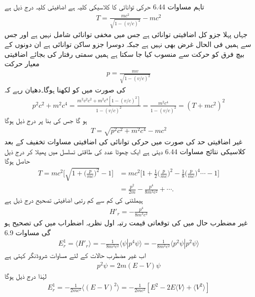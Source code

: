 تاہم مساوات 6.44 حرکی توانائی کا کلاسیکی کلیہ ہے اضافیتی کلیہ درج ذیل ہے 
\begin{align}
T = \frac{mc^2}{\sqrt{1 - (v/c)^2}} - mc^2
\end{align}
جہاں پہلا جزو کل اضافیتی  توانائی ہے جس میں مخفی توانائی شامل نہیں ہے اور جس سے ہمیں فی الحال غرض بھی نہیں ہے جبکہ دوسرا جزو ساکن توانائی ہے ان دونوں کے بیچ فرق کو حرکت سے منسوب کیا جا سکتا ہے ہمیں سمتی رفتار کی بجائے  اضافیتی معیار حرکت
\begin{align}
p = \frac{mv}{\sqrt{1 - (v/c)^2}}
\end{align}
 کی صورت میں  کو لکھنا ہوگا۔دھیان رہے کہ
\begin{align*}
p^2 c^2 + m^2 c^4 = \frac{m^2 v^2 c^2 + m^2 c^4 [1 - (v/c)^2]}{1 - (v/c)^2} = \frac{m^2 c^4}{1 - (v/c)^2} = (T + mc^2)^2
\end{align*}
ہو گا جس کی بنا پر درج ذیل ہوگا 
\begin{align}
T = \sqrt{p^2 c^2 + m^2 c^4} - mc^2
\end{align}
غیر اضافیتی حد  کی صورت میں حرکی توانائی کی اضافیتی مساوات تخفیف کے بعد کلاسیکی نتائج مساوات 6.44 دیتی ہے ایک چھوٹا عدد  کی طاقتی تسلسل میں پھیلا کر درج ذیل حاصل ہوگا 
\begin{align}
T = mc^2 \big [ \sqrt{1 + \big(\frac{p}{mc}\big)^2}  - 1 \big ] &= mc^2 \big [ 1 + \frac{1}{2} \big(\frac{p}{mc}\big)^2 - \frac{1}{8} \big(\frac{p}{mc}\big)^4 \cdots - 1 \big ] \nonumber \\
&= \frac{p^2}{2m} - \frac{p^4}{8m^3 c^2} + \cdots .
\end{align}
ہیملٹنی کی کم سے کم رتبی اضافیتی تصحیح درج ذیل ہے 
\begin{align}
H'_r = - \frac{p^4}{8m^3 c^2}
\end{align}
غیر مضطرب حال میں  کی توقعاتی قیمت رتبہ اول نظریہ اضطراب میں  کی تصحیح  ہو گی مساوات 6.9 
\begin{align}
E_r^1 = \langle H'_r \rangle = - \frac{1}{8 m^3 c^2} \langle \psi | p^4 \psi \rangle = - \frac{1}{8m^3 c^2} \langle p^2 \psi | p^2 \psi \rangle
\end{align}
اب غیر مضطرب حالات کے لئے مساوات شروڈنگر کہتی ہے 
\begin{align}
p^2 \psi = 2m (E - V) \psi
\end{align}
 لہٰذا   درج ذیل ہوگا 
\begin{align}
E_r^1 = - \frac{1}{2mc^2} \langle (E - V)^2 \rangle = - \frac{1}{2mc^2} [E^2 - 2E \langle V \rangle + \langle V^2 \rangle]
\end{align}
